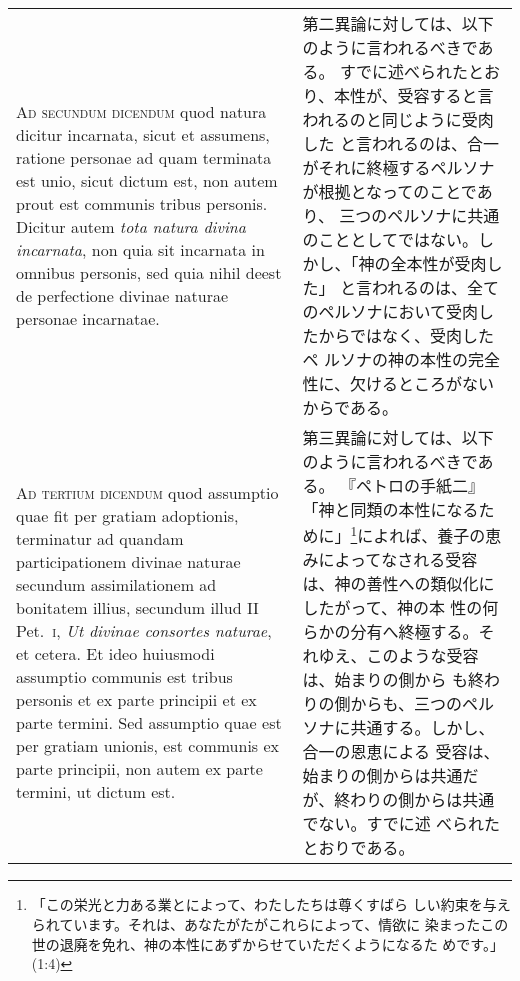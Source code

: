 \documentclass[10pt]{jsarticle} %
\begin{document}
\begin{longtable}{p{21em}p{21em}}
\\



{\scshape Ad secundum dicendum} quod natura dicitur incarnata, sicut et assumens,
ratione personae ad quam terminata est unio, sicut dictum est, non autem
prout est communis tribus personis. Dicitur autem {\itshape tota natura divina
incarnata}, non quia sit incarnata in omnibus personis, sed quia nihil
deest de perfectione divinae naturae personae incarnatae.


&

第二異論に対しては、以下のように言われるべきである。
すでに述べられたとおり、本性が、受容すると言われるのと同じように受肉した
 と言われるのは、合一がそれに終極するペルソナが根拠となってのことであり、
 三つのペルソナに共通のこととしてではない。しかし、「神の全本性が受肉した」
 と言われるのは、全てのペルソナにおいて受肉したからではなく、受肉したペ
 ルソナの神の本性の完全性に、欠けるところがないからである。


\\



{\scshape Ad tertium dicendum} quod assumptio quae fit per gratiam adoptionis,
terminatur ad quandam participationem divinae naturae secundum
assimilationem ad bonitatem illius, secundum illud II Pet.~{\scshape i}, {\itshape Ut divinae
consortes naturae}, et cetera. Et ideo huiusmodi assumptio communis est
tribus personis et ex parte principii et ex parte termini. Sed assumptio
quae est per gratiam unionis, est communis ex parte principii, non autem
ex parte termini, ut dictum est.


&

第三異論に対しては、以下のように言われるべきである。
『ペトロの手紙二』「神と同類の本性になるた
 めに」\footnote{「この栄光と力ある業とによって、わたしたちは尊くすばら
 しい約束を与えられています。それは、あなたがたがこれらによって、情欲に
 染まったこの世の退廃を免れ、神の本性にあずからせていただくようになるた
 めです。」(1:4)}によれば、養子の恵みによってなされる受容は、神の善性への類似化にしたがって、神の本
 性の何らかの分有へ終極する。それゆえ、このような受容は、始まりの側から
 も終わりの側からも、三つのペルソナに共通する。しかし、合一の恩恵による
 受容は、始まりの側からは共通だが、終わりの側からは共通でない。すでに述
 べられたとおりである。





\end{longtable}
\newpage
\end{document}
